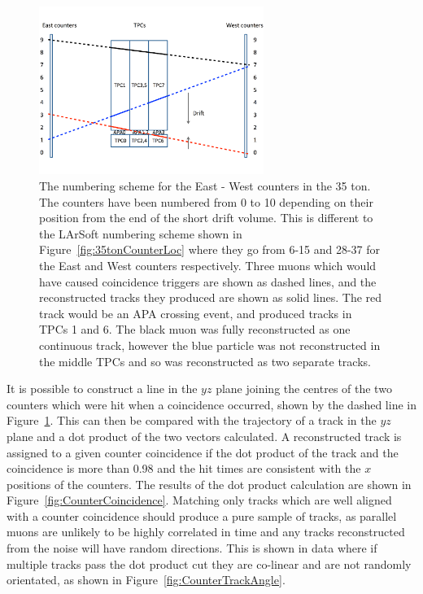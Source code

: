 \begin{figure}[h!]
  \centering
  \includegraphics[width=0.65\textwidth]{CounterSchematic}
  \caption[The numbering scheme for the East - West counters in the 35 ton]
          {The numbering scheme for the East - West counters in the 35 ton. The counters have been numbered from 0 to 10 depending on their position from the end of the short drift volume. This is different to the LArSoft numbering scheme shown in Figure~\ref{fig:35tonCounterLoc} where they go from 6-15 and 28-37 for the East and West counters respectively. Three muons which would have caused coincidence triggers are shown as dashed lines, and the reconstructed tracks they produced are shown as solid lines. The red track would be an APA crossing event, and produced tracks in TPCs 1 and 6. The black muon was fully reconstructed as one continuous track, however the blue particle was not reconstructed in the middle TPCs and so was reconstructed as two separate tracks.}
  \label{fig:EWCounters}
\end{figure}

It is possible to construct a line in the $yz$ plane joining the centres of the two counters which were hit when a coincidence occurred, shown by the dashed line in Figure~\ref{fig:EWCounters}. This can then be compared with the trajectory of a track in the $yz$ plane and a dot product of the two vectors calculated. A reconstructed track is assigned to a given counter coincidence if the dot product of the track and the coincidence is more than 0.98 and the hit times are consistent with the $x$ positions of the counters. The results of the dot product calculation are shown in Figure~\ref{fig:CounterCoincidence}. Matching only tracks which are well aligned with a counter coincidence should produce a pure sample of tracks, as parallel muons are unlikely to be highly correlated in time and any tracks reconstructed from the noise will have random directions. This is shown in data where if multiple tracks pass the dot product cut they are co-linear and are not randomly orientated, as shown in Figure~\ref{fig:CounterTrackAngle}. \\

